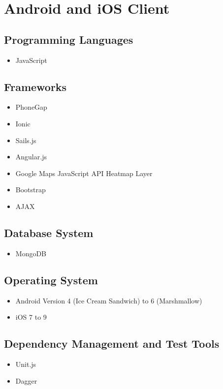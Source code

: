 \documentclass[11pt,fleqn]{book} %
\begin{document}
	\section{Android and iOS Client}
	\subsection{Programming Languages}
	\begin{itemize}
		\item JavaScript
	\end{itemize}
	\subsection{Frameworks}
	\begin{itemize}
		\item PhoneGap
		\item Ionic
		\item Sails.js
		\item Angular.js
		\item Google Maps JavaScript API Heatmap Layer
		\item Bootstrap
		\item AJAX					
	\end{itemize}
	\subsection{Database System}
	\begin{itemize}
		\item MongoDB
	\end{itemize}
	\subsection{Operating System}
	\begin{itemize}
		\item Android Version 4 (Ice Cream Sandwich) to 6 (Marshmallow)
		\item iOS 7 to 9				
	\end{itemize}
	\subsection{Dependency Management and Test Tools}
	\begin{itemize}
		\item Unit.js
		\item Dagger
	\end{itemize}
	
	
\end{document}
